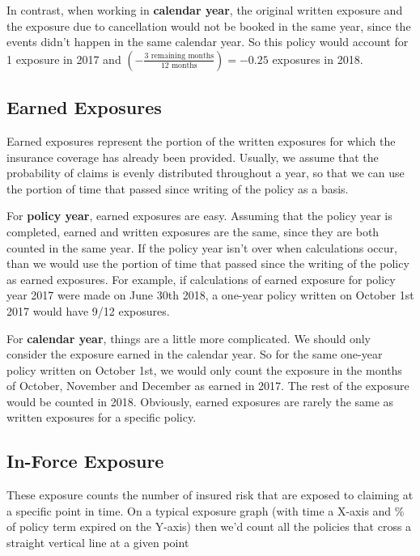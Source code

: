 \documentclass[11pt, english]{memoir}
\numberwithin{definition}{section}
\begin{document}
	In contrast, when working in \textbf{calendar year}, the original written exposure and the exposure due to cancellation would not be booked in the same year, since the events didn't happen in the same calendar year. So this policy would account for 1 exposure in 2017 and $(-\frac{\text{3 remaining months}}{\text{12 months}}) = -0.25$ exposures in 2018. 
	
	
	\subsection{Earned Exposures}
	Earned exposures represent the portion of the written exposures for which the insurance coverage has already been provided. Usually, we assume that the probability of claims is evenly distributed throughout a year, so that we can use the portion of time that passed since writing of the policy as a basis. 
	
	For \textbf{policy year}, earned exposures are easy. Assuming that the policy year is completed, earned and written exposures are the same, since they are both counted in the same year. If the policy year isn't over when calculations occur, than we would use the portion of time that passed since the writing of the policy as earned exposures. For example, if calculations of earned exposure for policy year 2017 were made on June 30th 2018, a one-year policy written on October 1st 2017 would have 9/12 exposures.
	
	For \textbf{calendar year}, things are a little more complicated. We should only consider the exposure earned in the calendar year. So for the same one-year policy written on October 1st, we would only count the exposure in the months of October, November and December as earned in 2017. The rest of the exposure would be counted in 2018. Obviously, earned exposures are rarely the same as written exposures for a specific policy. 
	
	
	
	\subsection{In-Force Exposure}
	These exposure counts the number of insured risk that are exposed to claiming at a specific point in time. On a typical exposure graph (with time a X-axis and \% of policy term expired on the Y-axis) then we'd count all the policies that cross a straight vertical line at a given point 
	
	
\end{document}
